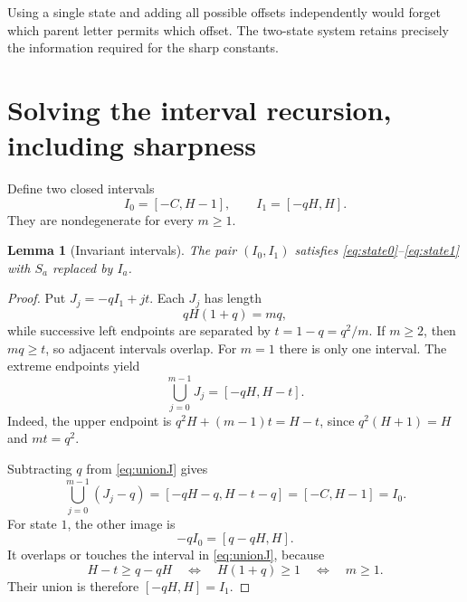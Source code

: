 \documentclass[11pt]{article}
\numberwithin{equation}{section}
\newtheorem{lemma}[theorem]{Lemma}
\theoremstyle{definition}
\theoremstyle{remark}
\begin{document}
Using a single state and adding all possible offsets independently would
forget which parent letter permits which offset. The two-state system
retains precisely the information required for the sharp constants.

\section{Solving the interval recursion, including sharpness}\label{sec:intervals}

Define two closed intervals
\begin{equation}\label{eq:intervals}
I_0=[-C,H-1],\qquad I_1=[-qH,H].
\end{equation}
They are nondegenerate for every $m\ge1$.

\begin{lemma}[Invariant intervals]\label{lem:intervals}
The pair $(I_0,I_1)$ satisfies \eqref{eq:state0}--\eqref{eq:state1}
with $S_a$ replaced by $I_a$.
\end{lemma}
\begin{proof}
Put $J_j=-qI_1+jt$. Each $J_j$ has length
\[
qH(1+q)=mq,
\]
while successive left endpoints are separated by $t=1-q=q^2/m$.
If $m\ge2$, then $mq\ge t$, so adjacent intervals overlap. For $m=1$
there is only one interval. The extreme endpoints yield
\begin{equation}\label{eq:unionJ}
\bigcup_{j=0}^{m-1}J_j=[-qH,H-t].
\end{equation}
Indeed, the upper endpoint is $q^2H+(m-1)t=H-t$, since
$q^2(H+1)=H$ and $mt=q^2$.

Subtracting $q$ from \eqref{eq:unionJ} gives
\[
\bigcup_{j=0}^{m-1}(J_j-q)=[-qH-q,H-t-q]=[-C,H-1]=I_0.
\]
For state $1$, the other image is
\[
-qI_0=[q-qH,H].
\]
It overlaps or touches the interval in \eqref{eq:unionJ}, because
\[
H-t\ge q-qH
\quad\Longleftrightarrow\quad H(1+q)\ge1
\quad\Longleftrightarrow\quad m\ge1.
\]
Their union is therefore $[-qH,H]=I_1$.
\end{proof}
\end{document}
